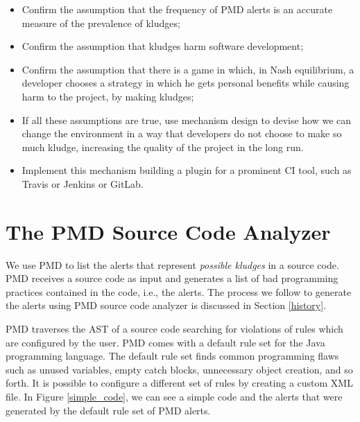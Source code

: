 \documentclass[
]{article}
\begin{document}
%
%

\begin{itemize}
\item
  Confirm the assumption that the frequency of PMD alerts is an accurate
  measure of the prevalence of kludges;
  
\item
  Confirm the assumption that kludges harm software development;

\item
  Confirm the assumption that there is a game in which, in Nash
  equilibrium, a developer chooses a strategy in which he gets personal
  benefits while causing harm to the project, by making kludges;

\item
  If all these assumptions are true, use mechanism design to devise how
  we can change the environment in a way that developers do not choose
  to make so much kludge, increasing the quality of the project in the
  long run.

\item
  Implement this mechanism building a plugin for a prominent CI tool,
  such as Travis or Jenkins or GitLab.
\end{itemize}



\section{The PMD Source Code Analyzer}\label{pmd}

We use PMD to list the alerts that represent \textit{possible kludges} in a source code. PMD receives a source code as input and generates a list of bad programming practices contained in the code, i.e., the alerts. The process we follow to generate the alerts using PMD source code analyzer is discussed in Section \ref{history}.


PMD traverses the AST of a source code searching for violations of rules
which are configured by the user. PMD comes with a default rule set for
the Java programming language. The default rule set finds common
programming flaws such as unused variables, empty catch blocks,
unnecessary object creation, and so forth. It is possible to configure a
different set of rules by creating a custom XML file. In Figure
\ref{simple_code}, we can see a simple code and the alerts
that were generated by the default rule set of PMD alerts.
\end{document}
